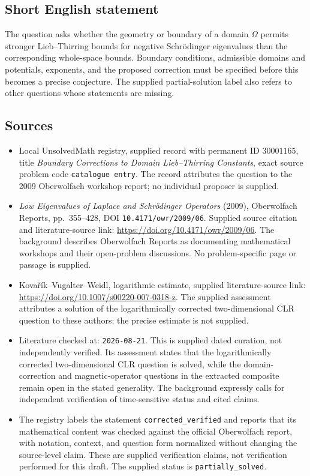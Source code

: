 \documentclass[11pt]{article}
\begin{document}
\subsection{Short English statement}
The question asks whether the geometry or boundary of a domain \(\Omega\) permits stronger Lieb--Thirring bounds for negative Schrödinger eigenvalues than the corresponding whole-space bounds. Boundary conditions, admissible domains and potentials, exponents, and the proposed correction must be specified before this becomes a precise conjecture. The supplied partial-solution label also refers to other questions whose statements are missing.
\subsection{Sources}
\begin{itemize}
\item Local UnsolvedMath registry, supplied record with permanent ID \(30001165\), title \emph{Boundary Corrections to Domain Lieb--Thirring Constants}, exact source problem code \texttt{catalogue entry}. The record attributes the question to the 2009 Oberwolfach workshop report; no individual proposer is supplied.
\item \emph{Low Eigenvalues of Laplace and Schrödinger Operators} (2009), Oberwolfach Reports, pp.~355--428, DOI \texttt{10.4171/owr/2009/06}. Supplied source citation and literature-source link: \url{https://doi.org/10.4171/owr/2009/06}. The background describes Oberwolfach Reports as documenting mathematical workshops and their open-problem discussions. No problem-specific page or passage is supplied.
\item Kovařík--Vugalter--Weidl, logarithmic estimate, supplied literature-source link: \url{https://doi.org/10.1007/s00220-007-0318-z}. The supplied assessment attributes a solution of the logarithmically corrected two-dimensional CLR question to these authors; the precise estimate is not supplied.
\item Literature checked at: \texttt{2026-08-21}. This is supplied dated curation, not independently verified. Its assessment states that the logarithmically corrected two-dimensional CLR question is solved, while the domain-correction and magnetic-operator questions in the extracted composite remain open in the stated generality. The background expressly calls for independent verification of time-sensitive status and cited claims.
\item The registry labels the statement \texttt{corrected\_verified} and reports that its mathematical content was checked against the official Oberwolfach report, with notation, context, and question form normalized without changing the source-level claim. These are supplied verification claims, not verification performed for this draft. The supplied status is \texttt{partially\_solved}.
\end{itemize}
\end{document}
